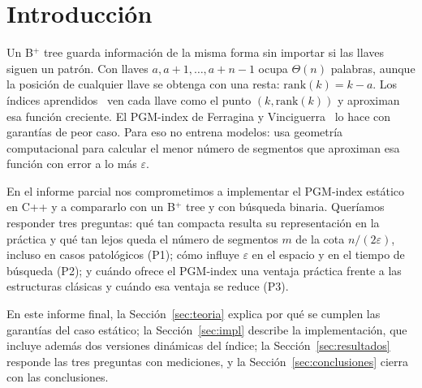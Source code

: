 \section{Introducción}

Un B$^+$ tree guarda información de la misma forma sin importar si las llaves siguen un patrón.
Con llaves $a, a+1, \dots, a+n-1$ ocupa $\Theta(n)$ palabras, aunque la posición de cualquier
llave se obtenga con una resta: $\mathrm{rank}(k) = k-a$. Los índices aprendidos~\cite{kraska2018}
ven cada llave como el punto $(k, \mathrm{rank}(k))$ y aproximan esa función creciente. El
PGM-index de Ferragina y Vinciguerra~\cite{ferragina2020pgm,ferragina2019arxiv} lo hace con
garantías de peor caso. Para eso no entrena modelos: usa geometría computacional para calcular
el menor número de segmentos que aproximan esa función con error a lo más $\varepsilon$.

En el informe parcial nos comprometimos a implementar el PGM-index estático en C++ y a
compararlo con un B$^+$ tree y con búsqueda binaria. Queríamos responder tres preguntas: qué tan
compacta resulta su representación en la práctica y qué tan lejos queda el número de segmentos
$m$ de la cota $n/(2\varepsilon)$, incluso en casos patológicos (P1); cómo influye $\varepsilon$
en el espacio y en el tiempo de búsqueda (P2); y cuándo ofrece el PGM-index una ventaja práctica
frente a las estructuras clásicas y cuándo esa ventaja se reduce (P3).

En este informe final, la Sección~\ref{sec:teoria} explica por qué se cumplen las garantías del
caso estático; la Sección~\ref{sec:impl} describe la implementación, que incluye además dos
versiones dinámicas del índice; la Sección~\ref{sec:resultados} responde las tres preguntas con
mediciones, y la Sección~\ref{sec:conclusiones} cierra con las conclusiones.
